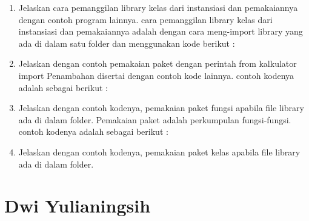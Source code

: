 \begin{enumerate}
    \item Jelaskan cara pemanggilan library kelas dari instansiasi dan pemakaiannya dengan contoh program lainnya.
cara pemanggilan  library kelas dari instansiasi dan pemakaiannya adalah dengan cara meng-import library yang ada di dalam satu folder dan menggunakan kode berikut :
 

    \item Jelaskan dengan contoh pemakaian paket dengan perintah from kalkulator import Penambahan disertai dengan contoh kode lainnya.
contoh kodenya adalah sebagai berikut :
 

    \item Jelaskan dengan contoh kodenya, pemakaian paket fungsi apabila file library ada di dalam folder.
 Pemakaian paket adalah perkumpulan fungsi-fungsi. contoh kodenya adalah sebagai berikut :
 

    \item Jelaskan dengan contoh kodenya, pemakaian paket kelas apabila file library ada di dalam folder.
 
 \end{enumerate}


\section{Dwi Yulianingsih}

